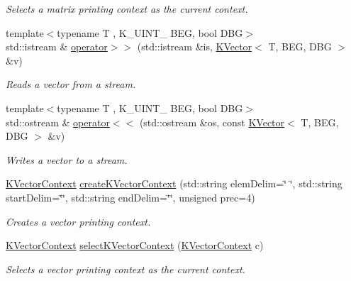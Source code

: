\begin{DoxyCompactItemize}
\begin{DoxyCompactList}\small\item\em Selects a matrix printing context as the current context. \end{DoxyCompactList}\item 
{\footnotesize template$<$typename T , K\+\_\+\+U\+I\+N\+T\+\_ B\+EG, bool D\+BG$>$ }\\std\+::istream \& \mbox{\hyperlink{namespaceKalman_a4bf582c1c296684605647e3e34ff5c82}{operator$>$$>$}} (std\+::istream \&is, \mbox{\hyperlink{classKalman_1_1KVector}{K\+Vector}}$<$ T, B\+EG, D\+BG $>$ \&v)
\begin{DoxyCompactList}\small\item\em Reads a vector from a stream. \end{DoxyCompactList}\item 
{\footnotesize template$<$typename T , K\+\_\+\+U\+I\+N\+T\+\_ B\+EG, bool D\+BG$>$ }\\std\+::ostream \& \mbox{\hyperlink{namespaceKalman_a9ef55cd5e98291bb4749bbcc7f8e5f56}{operator$<$$<$}} (std\+::ostream \&os, const \mbox{\hyperlink{classKalman_1_1KVector}{K\+Vector}}$<$ T, B\+EG, D\+BG $>$ \&v)
\begin{DoxyCompactList}\small\item\em Writes a vector to a stream. \end{DoxyCompactList}\item 
\mbox{\label{namespaceKalman_a0528a0c13f6cd66f06a0aa3084f640f9}} 
\mbox{\hyperlink{namespaceKalman_a754bbcbae0bf32d47b585116e5d91967}{K\+Vector\+Context}} \mbox{\hyperlink{namespaceKalman_a0528a0c13f6cd66f06a0aa3084f640f9}{create\+K\+Vector\+Context}} (std\+::string elem\+Delim=\char`\"{} \char`\"{}, std\+::string start\+Delim=\char`\"{}\char`\"{}, std\+::string end\+Delim=\char`\"{}\char`\"{}, unsigned prec=4)
\begin{DoxyCompactList}\small\item\em Creates a vector printing context. \end{DoxyCompactList}\item 
\mbox{\label{namespaceKalman_af72a4d89b04c7ed383878315b0895834}} 
\mbox{\hyperlink{namespaceKalman_a754bbcbae0bf32d47b585116e5d91967}{K\+Vector\+Context}} \mbox{\hyperlink{namespaceKalman_af72a4d89b04c7ed383878315b0895834}{select\+K\+Vector\+Context}} (\mbox{\hyperlink{namespaceKalman_a754bbcbae0bf32d47b585116e5d91967}{K\+Vector\+Context}} c)
\begin{DoxyCompactList}\small\item\em Selects a vector printing context as the current context. \end{DoxyCompactList}\end{DoxyCompactItemize}
